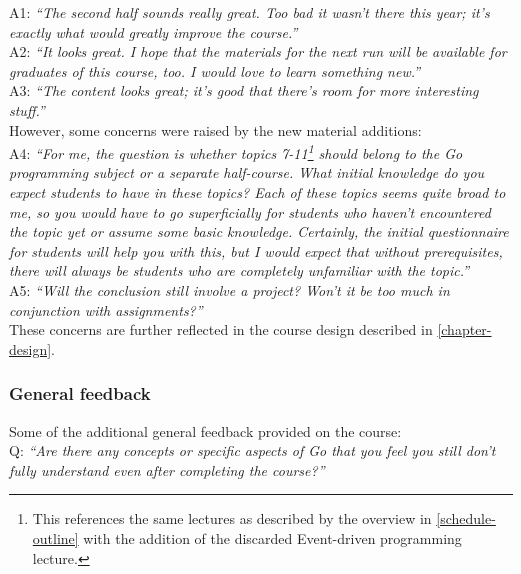 \documentclass[
  digital,
  color,
  oneside,
  nosansbold,
  nocolorbold,
  nolof,
  nolot,
]{fithesis4}
\begin{document}
\noindent
A1: \textit{\enquote{The second half sounds really great. Too bad it wasn't there this year; it's exactly what would greatly improve the course.}} \\

\noindent
A2: \textit{\enquote{It looks great. I hope that the materials for the next run will be available for graduates of this course, too. I would love to learn something new.}} \\

\noindent
A3: \textit{\enquote{The content looks great; it's good that there's room for more interesting stuff.}} \\

\noindent
However, some concerns were raised by the new material additions: \\

\noindent
A4: \textit{\enquote{For me, the question is whether topics 7-11\footnote{This references the same lectures as described by the overview in \cref{schedule-outline} with the addition of the discarded Event-driven programming lecture.} should belong to the Go programming subject or a separate half-course. What initial knowledge do you expect students to have in these topics? Each of these topics seems quite broad to me, so you would have to go superficially for students who haven't encountered the topic yet or assume some basic knowledge. Certainly, the initial questionnaire for students will help you with this, but I would expect that without prerequisites, there will always be students who are completely unfamiliar with the topic.}} \\

\noindent
A5: \textit{\enquote{Will the conclusion still involve a project? Won't it be too much in conjunction with assignments?}} \\

\noindent
These concerns are further reflected in the course design described in \cref{chapter-design}. \\

\subsubsection{General feedback}\label{general-feedback}

\noindent
Some of the additional general feedback provided on the course: \\

\noindent
Q: \textit{\enquote{Are there any concepts or specific aspects of Go that you feel you still don't fully understand even after completing the course?}} \\
\end{document}
